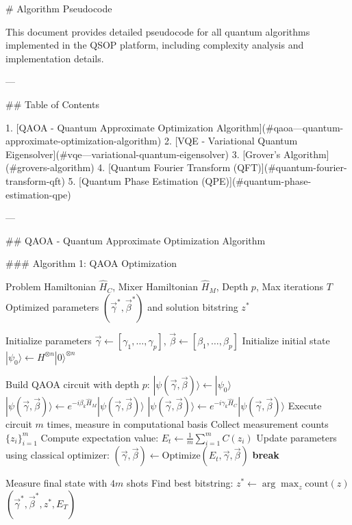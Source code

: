 # Algorithm Pseudocode

This document provides detailed pseudocode for all quantum algorithms implemented in the QSOP platform, including complexity analysis and implementation details.

---

## Table of Contents

1. [QAOA - Quantum Approximate Optimization Algorithm](#qaoa---quantum-approximate-optimization-algorithm)
2. [VQE - Variational Quantum Eigensolver](#vqe---variational-quantum-eigensolver)
3. [Grover's Algorithm](#grovers-algorithm)
4. [Quantum Fourier Transform (QFT)](#quantum-fourier-transform-qft)
5. [Quantum Phase Estimation (QPE)](#quantum-phase-estimation-qpe)

---

## QAOA - Quantum Approximate Optimization Algorithm

### Algorithm 1: QAOA Optimization

\begin{algorithm}
\caption{Quantum Approximate Optimization Algorithm (QAOA)}
\begin{algorithmic}[1]
\REQUIRE Problem Hamiltonian $\hat{H}_C$, Mixer Hamiltonian $\hat{H}_M$, Depth $p$, Max iterations $T$
\ENSURE Optimized parameters $(\vec{\gamma}^*, \vec{\beta}^*)$ and solution bitstring $z^*$

\STATE Initialize parameters $\vec{\gamma} \gets [\gamma_1, \ldots, \gamma_p]$, $\vec{\beta} \gets [\beta_1, \ldots, \beta_p]$
\STATE Initialize initial state $|\psi_0\rangle \gets H^{\otimes n} |0\rangle^{\otimes n}$

    \STATE Build QAOA circuit with depth $p$:
    \STATE \quad $|\psi(\vec{\gamma}, \vec{\beta})\rangle \gets |\psi_0\rangle$
        \STATE \quad $|\psi(\vec{\gamma}, \vec{\beta})\rangle \gets e^{-i\beta_k \hat{H}_M} |\psi(\vec{\gamma}, \vec{\beta})\rangle$
        \STATE \quad $|\psi(\vec{\gamma}, \vec{\beta})\rangle \gets e^{-i\gamma_k \hat{H}_C} |\psi(\vec{\gamma}, \vec{\beta})\rangle$
    \ENDFOR
    \STATE Execute circuit $m$ times, measure in computational basis
    \STATE Collect measurement counts $\{z_i\}_{i=1}^m$
    \STATE Compute expectation value: $E_t \gets \frac{1}{m} \sum_{i=1}^m C(z_i)$
    \STATE Update parameters using classical optimizer:
    \STATE \quad $(\vec{\gamma}, \vec{\beta}) \gets \text{Optimize}(E_t, \vec{\gamma}, \vec{\beta})$
        \STATE \textbf{break}
    \ENDIF
\ENDFOR

\STATE Measure final state with $4m$ shots
\STATE Find best bitstring: $z^* \gets \arg\max_z \text{count}(z)$
\RETURN $(\vec{\gamma}^*, \vec{\beta}^*, z^*, E_T)$
\end{algorithmic}
\end{algorithm}

